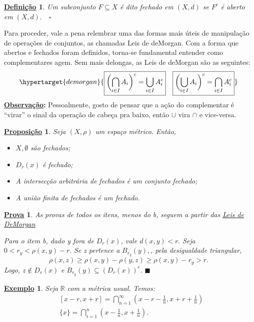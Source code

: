 \documentclass{article}
\newtheorem*{def*}{\underline{Defini\c c\~ao}}
\newtheorem*{prop*}{\underline{Proposi\c c\~ao}}
\newtheorem{example}{\underline{Exemplo}}
\newtheorem*{proof*}{\underline{Prova}}
\renewcommand\qedsymbol{$\blacksquare$}
\begin{document}
\begin{def*}
  Um subconjunto \(F\subseteq{X}\) é dito fechado em \((X, d)\) se \(F^{c}\) é aberto em \((X, d).\quad\square\)
\end{def*}
  Para proceder, vale a pena relembrar uma das formas mais úteis de manipulação de operações de conjuntos, as chamadas Leis de deMorgan. Com a forma que abertos e fechados foram definidos,
torna-se fundamental entender como complementares agem. Sem mais delongas, as Leis de deMorgan são as seguintes: 
  \[
    \hypertarget{demorgan}{\boxed{\biggl(\bigcap_{i\in I}^{}{A_{i}}\biggr)^{c} = \bigcup_{i\in I}^{}{A_{i}^{c}}}\quad\boxed{\biggl(\bigcup_{i\in I}^{}{A_{i}}\biggr)^{c} = \bigcap_{i\in I}^{}{A_{i}^{c}}}}
  \]
  \textbf{\underline{Observação}:} Pessoalmente, gosto de pensar que a ação do complementar é ``virar'' o sinal da operação de cabeça pra baixo, então \(\cup\) vira \(\cap\) e vice-versa.
\begin{prop*}
  Seja \((X, \rho )\) um espaço métrico. Então, 
 \begin{itemize}
   \item[a)] \(X, \emptyset\) são fechados;
   \item[b)] \(D_{r}(x)\) é fechado;
   \item[c)] A intersecção arbitrária de fechados é um conjunto fechado;
   \item[d)] A união finita de fechados é um fechado.
 \end{itemize}
\end{prop*}
\begin{proof*}
  As provas de todos os itens, menos do b, seguem a partir das \hyperlink{demorgan}{Leis de DeMorgan}

  Para o item b, dado y fora de \(D_{r}(x)\), vale \(d(x, y) < r.\) Seja \(0 < r_{y} < \rho (x, y) - r.\) Se z pertence a \(B_{r_{y}}(y),\), pela desigualdade triangular, 
    \[
      \rho (x, z)\geq \rho (x, y) - \rho (y, z)\geq \rho (x, y) - r_{y} > r.
    \]
    Logo, \(z\not\in D_{r}(x)\) e \(B_{r_{y}}(y)\subseteq{(D_{r}(x))^{c}}.\) \qedsymbol
\end{proof*}
\begin{example}
  Seja \(\mathbb{R}\) com a métrica usual. Temos:
 \begin{align*}
   &[x-r, x+r]=\bigcap_{n=1}^{\infty}{(x-r-\frac{1}{n}, x+r+\frac{1}{n})}\\
   &\{x\} = \bigcap_{i=1}^{n}{(x-\frac{1}{n}, x+\frac{1}{n})}.
 \end{align*}
\end{example}
\end{document}
